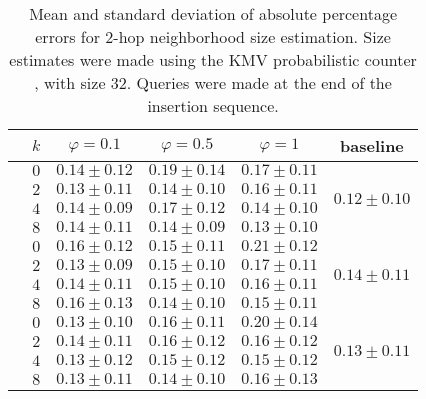 \begin{table}[ht]
    \centering
    \caption{Mean and standard deviation of absolute percentage errors for $2$-hop neighborhood size estimation. Size estimates were made using the KMV probabilistic counter \cite{trevisan/646978.711822}, with size $32$.
    Queries were made at the end of the insertion sequence.
    }
    \begin{tabular}{lc|ccc|c}
    \toprule
        & $k$ & $\varphi = 0.1$ & $\varphi = 0.5$ & $\varphi = 1$ & baseline\\
    \midrule
    
        \parbox[t]{2mm}{}

        & $0$ & $0.14 \pm 0.12$ & $0.19 \pm 0.14$ & $0.17 \pm 0.11$ &  \\
        & $2$ & $0.13 \pm 0.11$ & $0.14 \pm 0.10$ & $0.16 \pm 0.11$ & \\
        & $4$ & $0.14 \pm 0.09$ & $0.17 \pm 0.12$ & $0.14 \pm 0.10$ & \\
        & $8$ & $0.14 \pm 0.11$ & $0.14 \pm 0.09$ & $0.13 \pm 0.10$ & \\

        \midrule[.66pt]

        \parbox[t]{2mm}{}

        & $0$ & $0.16 \pm 0.12$ & $0.15 \pm 0.11$ & $0.21 \pm 0.12$ &  \\
        & $2$ & $0.13 \pm 0.09$ & $0.15 \pm 0.10$ & $0.17 \pm 0.11$ & \\
        & $4$ & $0.14 \pm 0.11$ & $0.15 \pm 0.10$ & $0.16 \pm 0.11$ & \\
        & $8$ & $0.16 \pm 0.13$ & $0.14 \pm 0.10$ & $0.15 \pm 0.11$ & \\

        \midrule[.66pt]

        \parbox[t]{2mm}{}

        & $0$ & $0.13 \pm 0.10$ & $0.16 \pm 0.11$ & $0.20 \pm 0.14$ &  \\
        & $2$ & $0.14 \pm 0.11$ & $0.16 \pm 0.12$ & $0.16 \pm 0.12$ & \\
        & $4$ & $0.13 \pm 0.12$ & $0.15 \pm 0.12$ & $0.15 \pm 0.12$ & \\
        & $8$ & $0.13 \pm 0.11$ & $0.14 \pm 0.10$ & $0.16 \pm 0.13$ & \\


\end{tabular}
\end{table}
